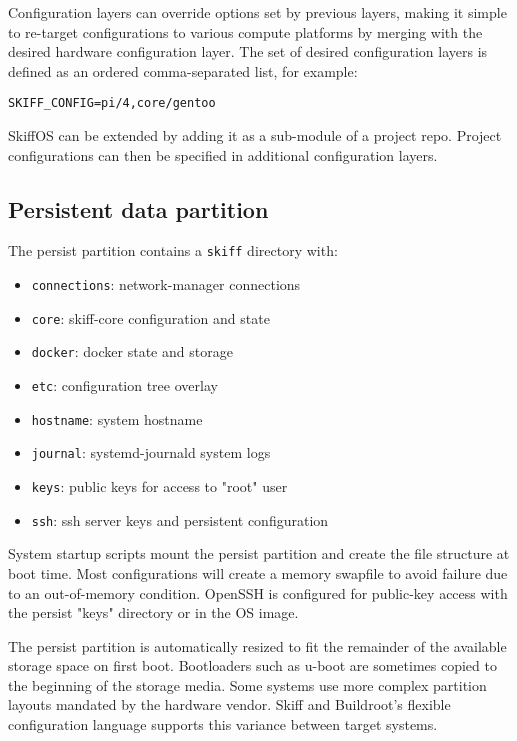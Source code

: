 \documentclass[english,]{IEEEtran}
\providecommand{\tightlist}{%
  \setlength{\itemsep}{0pt}\setlength{\parskip}{0pt}}
\begin{document}
Configuration layers can override options set by previous layers, making
it simple to re-target configurations to various compute platforms by
merging with the desired hardware configuration layer. The set of
desired configuration layers is defined as an ordered comma-separated
list, for example:

\texttt{SKIFF\_CONFIG=pi/4,core/gentoo}

SkiffOS can be extended \autocite{skiffext} by adding it as a sub-module
of a project repo. Project configurations can then be specified in
additional configuration layers.

\hypertarget{persistent-data-partition}{%
\subsection{Persistent data partition}\label{persistent-data-partition}}

The persist partition contains a \texttt{skiff} directory with:

\begin{itemize}
\tightlist
\item
  \texttt{connections}: network-manager connections
\item
  \texttt{core}: skiff-core configuration and state
\item
  \texttt{docker}: docker state and storage
\item
  \texttt{etc}: configuration tree overlay
\item
  \texttt{hostname}: system hostname
\item
  \texttt{journal}: systemd-journald system logs
\item
  \texttt{keys}: public keys for access to "root" user
\item
  \texttt{ssh}: ssh server keys and persistent configuration
\end{itemize}

System startup scripts mount the persist partition and create the file
structure at boot time. Most configurations will create a memory
swapfile to avoid failure due to an out-of-memory condition. OpenSSH is
configured for public-key access with the persist "keys" directory or in
the OS image.

The persist partition is automatically resized to fit the remainder of
the available storage space on first boot. Bootloaders such as u-boot
are sometimes copied to the beginning of the storage media. Some systems
use more complex partition layouts mandated by the hardware vendor.
Skiff and Buildroot's flexible configuration language supports this
variance between target systems.
\end{document}

